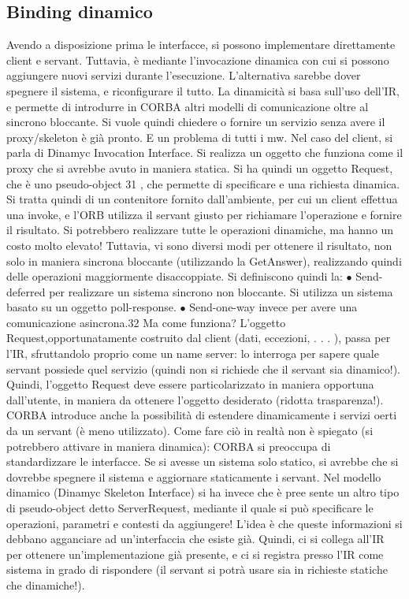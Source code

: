 \subsection{Binding dinamico}
Avendo a disposizione prima le interfacce, si possono implementare direttamente client e servant. Tuttavia, è mediante
l'invocazione dinamica con cui
si possono aggiungere nuovi servizi durante l'esecuzione. L'alternativa sarebbe
dover spegnere il sistema, e riconfigurare il tutto. La dinamicità si basa sull'uso
dell'IR, e permette di introdurre in CORBA altri modelli di comunicazione oltre
al sincrono bloccante.
Si vuole quindi chiedere o fornire un servizio senza avere il proxy/skeleton è già pronto. E un problema di tutti i mw.
Nel caso del client, si parla di Dinamyc Invocation Interface. Si realizza un oggetto che funziona come il proxy che si
avrebbe avuto in maniera statica. Si ha quindi un oggetto Request, che è uno pseudo-object 31 , che permette di
specificare e una richiesta dinamica. Si tratta quindi di un contenitore fornito dall'ambiente,
per cui un client effettua una invoke, e l'ORB utilizza il servant giusto per
richiamare l'operazione e fornire il risultato. Si potrebbero realizzare tutte le
operazioni dinamiche, ma hanno un costo molto elevato! Tuttavia, vi sono
diversi modi per ottenere il risultato, non solo in maniera sincrona bloccante
(utilizzando la GetAnswer), realizzando quindi delle operazioni maggiormente
disaccoppiate. Si definiscono quindi la:
$\bullet$ Send-deferred per realizzare un sistema sincrono non bloccante. Si utilizza
un sistema basato su un oggetto poll-response.
$\bullet$ Send-one-way invece per avere una comunicazione asincrona.32
Ma come funziona? L'oggetto Request,opportunatamente costruito dal client
(dati, eccezioni, . . . ), passa per l'IR, sfruttandolo proprio come un name server: lo interroga per sapere quale
servant possiede quel servizio (quindi non si
richiede che il servant sia dinamico!). Quindi, l'oggetto Request deve essere particolarizzato in maniera opportuna
dall'utente, in maniera da ottenere l'oggetto
desiderato (ridotta trasparenza!).
CORBA introduce anche la possibilità di estendere dinamicamente i servizi
oerti da un servant (è meno utilizzato). Come fare ciò in realtà non è spiegato
(si potrebbero attivare in maniera dinamica): CORBA si preoccupa di standardizzare le interfacce. Se si avesse un
sistema solo statico, si avrebbe che si
dovrebbe spegnere il sistema e aggiornare staticamente i servant.
Nel modello dinamico (Dinamyc Skeleton Interface) si ha invece che è pree
sente un altro tipo di pseudo-object detto ServerRequest, mediante il quale si può
specificare le operazioni, parametri e contesti da aggiungere! L'idea è che queste
informazioni si debbano agganciare ad un'interfaccia che esiste già. Quindi, ci
si collega all'IR per ottenere un'implementazione già presente, e ci si registra
presso l'IR come sistema in grado di rispondere (il servant si potrà usare sia in
richieste statiche che dinamiche!).
